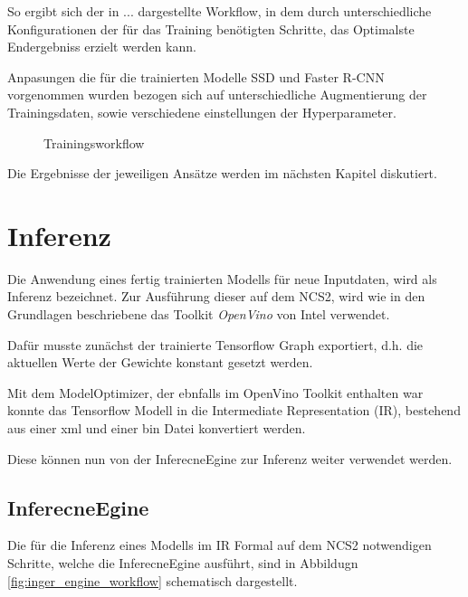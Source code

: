 So ergibt sich der in ... dargestellte Workflow, in dem 
durch unterschiedliche Konfigurationen der für das Training 
benötigten Schritte, das Optimalste Endergebniss erzielt 
werden kann.


Anpasungen die für die trainierten Modelle SSD und Faster 
R-CNN vorgenommen wurden bezogen sich auf unterschiedliche 
Augmentierung der Trainingsdaten, sowie verschiedene 
einstellungen der Hyperparameter.


%     

\vspace{1cm}
\begin{figure}[H]
    \centering
    
    \caption{Trainingsworkflow}
    \label{fig:train_workflow}
\end{figure}
\vspace{1cm}
Die Ergebnisse der jeweiligen Ansätze werden im nächsten Kapitel diskutiert.


\section{Inferenz}\label{sec:inferenz}

Die Anwendung eines fertig trainierten Modells für 
neue Inputdaten, wird als Inferenz bezeichnet.
Zur Ausführung dieser auf dem NCS2, wird wie in 
den Grundlagen beschriebene das Toolkit \textit{OpenVino}
von Intel verwendet.

Dafür musste zunächst der trainierte Tensorflow Graph 
exportiert, d.h. die aktuellen Werte der Gewichte 
konstant gesetzt werden.

Mit dem ModelOptimizer, der ebnfalls im OpenVino 
Toolkit enthalten war konnte das Tensorflow Modell 
in die Intermediate Representation (IR), bestehend 
aus einer xml und einer bin Datei konvertiert werden.


Diese können nun von der InferecneEgine zur Inferenz weiter 
verwendet werden.


\subsection*{InferecneEgine}


Die für die Inferenz eines Modells im IR Formal 
auf dem NCS2 notwendigen Schritte, welche die
 InferecneEgine ausführt, sind in Abbildugn
\ref{fig:inger_engine_workflow} schematisch dargestellt.

